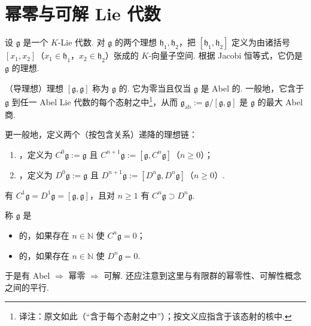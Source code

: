 \section{幂零与可解 Lie 代数}\label{sec:ssl-2-4}
设 $\mathfrak{g}$ 是一个 $K$-Lie 代数. 对 $\mathfrak{g}$ 的两个理想 $\mathfrak{h}_1, \mathfrak{h}_2$，把 $[\mathfrak{h}_1, \mathfrak{h}_2]$ 定义为由诸括号 $[x_1, x_2]$（$x_1 \in \mathfrak{h}_1$，$x_2 \in \mathfrak{h}_2$）张成的 $K$-向量子空间. 根据 Jacobi 恒等式，它仍是 $\mathfrak{g}$ 的理想.
\begin{example*}
（导理想）理想 $[\mathfrak{g}, \mathfrak{g}]$ 称为 $\mathfrak{g}$ 的. 它为零当且仅当 $\mathfrak{g}$ 是 Abel 的. 一般地，它含于 $\mathfrak{g}$ 到任一 Abel Lie 代数的每个态射之中\footnote{译注：原文如此（``含于每个态射之中''）；按文义应指含于该态射的核中.}，从而 $\mathfrak{g}_{\mathrm{ab}} := \mathfrak{g}/[\mathfrak{g}, \mathfrak{g}]$ 是 $\mathfrak{g}$ 的最大 Abel 商.
\end{example*}
更一般地，定义两个（按包含关系）递降的理想链：
\begin{enumerate}[label=\roman*)]
\item {}，定义为 $C^0\mathfrak{g} := \mathfrak{g}$ 且 $C^{n+1}\mathfrak{g} := [\mathfrak{g}, C^n\mathfrak{g}]$（$n \geqslant 0$）；
\item {}，定义为 $D^0\mathfrak{g} := \mathfrak{g}$ 且 $D^{n+1}\mathfrak{g} := [D^n\mathfrak{g}, D^n\mathfrak{g}]$（$n \geqslant 0$）.
\end{enumerate}
有 $C^1\mathfrak{g} = D^1\mathfrak{g} = [\mathfrak{g}, \mathfrak{g}]$，且对 $n \geqslant 1$ 有 $C^n\mathfrak{g} \supset D^n\mathfrak{g}$.
\begin{definition}\label{def:ssl-2-4-1}
称 $\mathfrak{g}$ 是
\begin{itemize}[label=\textendash]
\item {}的，如果存在 $n \in \mathbb{N}$ 使 $C^n\mathfrak{g} = 0$；
\item {}的，如果存在 $n \in \mathbb{N}$ 使 $D^n\mathfrak{g} = 0$.
\end{itemize}
于是有 Abel $\Rightarrow$ 幂零 $\Rightarrow$ 可解. 还应注意到这里与有限群的幂零性、可解性概念之间的平行.
\end{definition}
